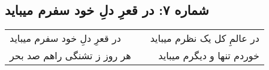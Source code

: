 \begin{center}
\section*{شماره ۷: در قعرِ دلِ خود سفرم میباید}
\label{sec:007}
\begin{longtable}{l p{0.5cm} r}
در قعرِ دلِ خود سفرم میباید
&&
در عالمِ کل یک نظرم میباید
\\
هر روز ز تشنگی راهم صد بحر
&&
خوردم تنها و دیگرم میباید
\\
\end{longtable}
\end{center}

